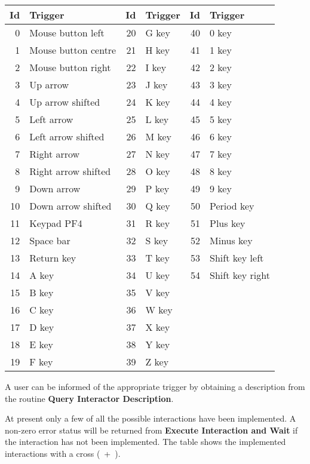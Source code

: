 \begin{small}
\begin{center}
\begin{tabular}{|r|p{9em}||r|p{9em}||r|p{9em}|}
\hline
Id & Trigger & Id & Trigger & Id & Trigger \\
\hline
0 & Mouse button left   & 20 &  G key & 40 & 0 key \\
1 & Mouse button centre & 21 &  H key & 41 & 1 key \\
2 & Mouse button right  & 22 &  I key & 42 & 2 key \\
3 & Up arrow            & 23 &  J key & 43 & 3 key \\
4 & Up arrow shifted    & 24 &  K key & 44 & 4 key \\
5 & Left arrow          & 25 &  L key & 45 & 5 key \\
6 & Left arrow shifted  & 26 &  M key & 46 & 6 key \\
7 & Right arrow         & 27 &  N key & 47 & 7 key \\
8 & Right arrow shifted & 28 &  O key & 48 & 8 key \\
9 & Down arrow          & 29 &  P key & 49 & 9 key \\
10 & Down arrow shifted  & 30 & Q key & 50 & Period key \\
11 & Keypad PF4          & 31 & R key & 51 & Plus key \\
12 & Space bar           & 32 & S key & 52 & Minus key \\
13 & Return key          & 33 & T key & 53 & Shift key left \\
14 & A key               & 34 & U key & 54 & Shift key right \\
15 & B key               & 35 & V key & & \\
16 & C key               & 36 & W key & & \\
17 & D key               & 37 & X key & & \\
18 & E key               & 38 & Y key & & \\
19 & F key               & 39 & Z key & & \\
\hline
\end{tabular}
\end{center}
\end{small}

A user can be informed of the appropriate trigger by obtaining a description
from the routine {\bf Query Interactor Description}.

At present only a few of all the possible interactions have been implemented.
A non-zero error status will be returned from {\bf Execute Interaction and
Wait} if the interaction has not been implemented.
The table shows the implemented interactions with a cross (~+~).

